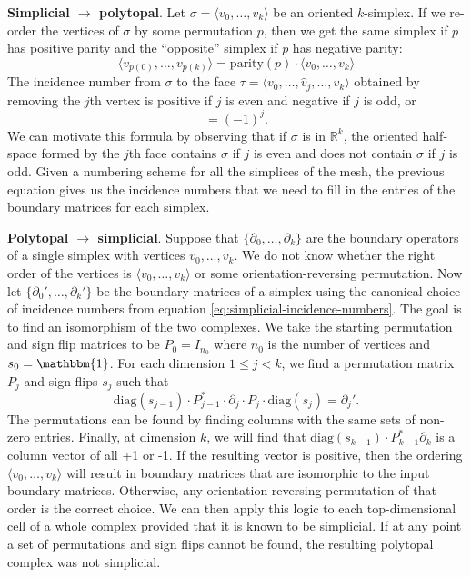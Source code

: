 \documentclass[twocolumn]{article}
\begin{document}
\textbf{Simplicial $\rightarrow$ polytopal}.
Let $\sigma = \langle v_0, \ldots, v_k\rangle$ be an oriented $k$-simplex.
If we re-order the vertices of $\sigma$ by some permutation $p$, then we get the same simplex if $p$ has positive parity and the ``opposite'' simplex if $p$ has negative parity:
\begin{equation}
    \langle v_{p(0)},\ldots,v_{p(k)}\rangle = \text{parity}(p)\cdot\langle v_0,\ldots, v_k\rangle
\end{equation}
The incidence number from $\sigma$ to the face $\tau = \langle v_0, \ldots, \hat v_j, \ldots, v_k\rangle$ obtained by removing the $j$th vertex is positive if $j$ is even and negative if $j$ is odd, or
\begin{equation}
    [\sigma, \tau] = (-1)^j.
    \label{eq:simplicial-incidence-numbers}
\end{equation}
We can motivate this formula by observing that if $\sigma$ is in $\mathbb{R}^k$, the oriented half-space formed by the $j$th face contains $\sigma$ if $j$ is even and does not contain $\sigma$ if $j$ is odd.
Given a numbering scheme for all the simplices of the mesh, the previous equation gives us the incidence numbers that we need to fill in the entries of the boundary matrices for each simplex.

\textbf{Polytopal $\rightarrow$ simplicial}.
Suppose that $\{\partial_0, \ldots, \partial_k\}$ are the boundary operators of a single simplex with vertices $v_0, \ldots, v_k$.
We do not know whether the right order of the vertices is $\langle v_0,\ldots,v_k\rangle$ or some orientation-reversing permutation.
Now let $\{\partial_0',\ldots,\partial_k'\}$ be the boundary matrices of a simplex using the canonical choice of incidence numbers from equation \eqref{eq:simplicial-incidence-numbers}.
The goal is to find an isomorphism of the two complexes.
We take the starting permutation and sign flip matrices to be $P_0 = I_{n_0}$ where $n_0$ is the number of vertices and $s_0 = \mathbbm{1}$.
For each dimension $1 \le j < k$, we find a permutation matrix $P_j$ and sign flips $s_j$ such that
\begin{equation}
    \text{diag}(s_{j - 1})\cdot P_{j - 1}^*\cdot\partial_j \cdot P_j\cdot \text{diag}(s_j) = \partial_j'.
\end{equation}
The permutations can be found by finding columns with the same sets of non-zero entries.
Finally, at dimension $k$, we will find that $\text{diag}(s_{k - 1})\cdot P_{k - 1}^*\partial_k$ is a column vector of all +1 or -1.
If the resulting vector is positive, then the ordering $\langle v_0,\ldots,v_k\rangle$ will result in boundary matrices that are isomorphic to the input boundary matrices.
Otherwise, any orientation-reversing permutation of that order is the correct choice.
We can then apply this logic to each top-dimensional cell of a whole complex provided that it is known to be simplicial.
If at any point a set of permutations and sign flips cannot be found, the resulting polytopal complex was not simplicial.
\end{document}
